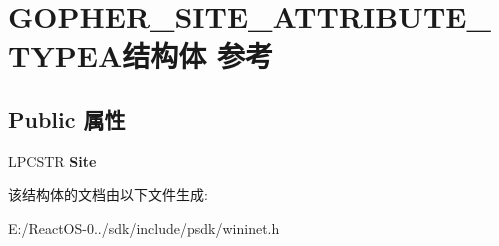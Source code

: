 \hypertarget{struct_g_o_p_h_e_r___s_i_t_e___a_t_t_r_i_b_u_t_e___t_y_p_e_a}{}\section{G\+O\+P\+H\+E\+R\+\_\+\+S\+I\+T\+E\+\_\+\+A\+T\+T\+R\+I\+B\+U\+T\+E\+\_\+\+T\+Y\+P\+E\+A结构体 参考}
\label{struct_g_o_p_h_e_r___s_i_t_e___a_t_t_r_i_b_u_t_e___t_y_p_e_a}
\subsection*{Public 属性}
\begin{DoxyCompactItemize}
\item 
\mbox{\label{struct_g_o_p_h_e_r___s_i_t_e___a_t_t_r_i_b_u_t_e___t_y_p_e_a_a34778075c3ff881b665bf2018a66ffda}} 
L\+P\+C\+S\+TR {\bfseries Site}
\end{DoxyCompactItemize}


该结构体的文档由以下文件生成\+:\begin{DoxyCompactItemize}
\item 
E\+:/\+React\+O\+S-\/0../sdk/include/psdk/wininet.\+h\end{DoxyCompactItemize}
